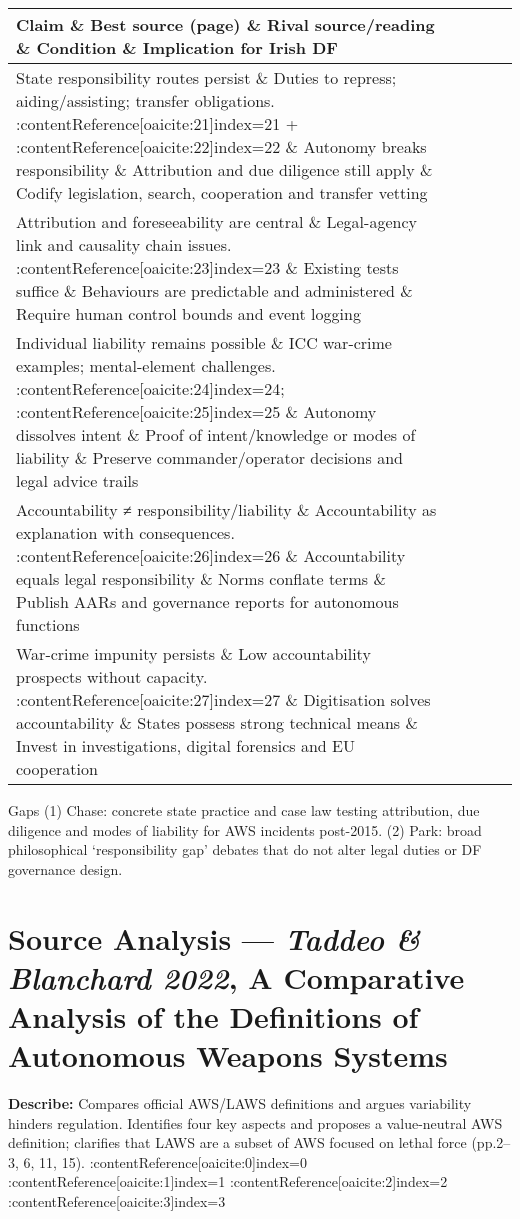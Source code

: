 \begin{tabular}{p{3.2cm}p{4.2cm}p{3.6cm}p{3.2cm}p{4.2cm}}
	\textbf{Claim} \& \textbf{Best source (page)} \& \textbf{Rival source/reading} \& \textbf{Condition} \& \textbf{Implication for Irish DF}\\\hline
	State responsibility routes persist \& Duties to repress; aiding/assisting; transfer obligations. {\small :contentReference[oaicite:21]{index=21} {\tiny +} :contentReference[oaicite:22]{index=22}} \& Autonomy breaks responsibility \& Attribution and due diligence still apply \& Codify legislation, search, cooperation and transfer vetting \\
	Attribution and foreseeability are central \& Legal-agency link and causality chain issues. {\small :contentReference[oaicite:23]{index=23}} \& Existing tests suffice \& Behaviours are predictable and administered \& Require human control bounds and event logging \\
	Individual liability remains possible \& ICC war-crime examples; mental-element challenges. {\small :contentReference[oaicite:24]{index=24}; :contentReference[oaicite:25]{index=25}} \& Autonomy dissolves intent \& Proof of intent/knowledge or modes of liability \& Preserve commander/operator decisions and legal advice trails \\
	Accountability ≠ responsibility/liability \& Accountability as explanation with consequences. {\small :contentReference[oaicite:26]{index=26}} \& Accountability equals legal responsibility \& Norms conflate terms \& Publish AARs and governance reports for autonomous functions \\
	War-crime impunity persists \& Low accountability prospects without capacity. {\small :contentReference[oaicite:27]{index=27}} \& Digitisation solves accountability \& States possess strong technical means \& Invest in investigations, digital forensics and EU cooperation \\\hline
\end{tabular}

Gaps
(1) Chase: concrete state practice and case law testing attribution, due diligence and modes of liability for AWS incidents post-2015.
(2) Park: broad philosophical ‘responsibility gap’ debates that do not alter legal duties or DF governance design.

\parencite{TADDEO_2022}

\section*{Source Analysis — \textit{Taddeo \& Blanchard 2022}, A Comparative Analysis of the Definitions of Autonomous Weapons Systems}
\textbf{Describe:} Compares official AWS/LAWS definitions and argues variability hinders regulation. Identifies four key aspects and proposes a value-neutral AWS definition; clarifies that LAWS are a subset of AWS focused on lethal force (pp.2–3, 6, 11, 15). :contentReference[oaicite:0]{index=0} :contentReference[oaicite:1]{index=1} :contentReference[oaicite:2]{index=2} :contentReference[oaicite:3]{index=3}


